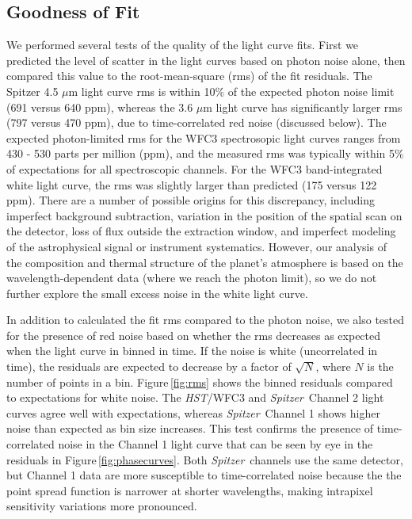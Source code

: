 \documentclass[twocolumn]{aastex61}
\newcommand{\project}[1]{\textsl{#1}}
\newcommand{\HST}{\project{HST}}
\newcommand{\Spitzer}{\project{Spitzer}}
\begin{document}
\subsection{Goodness of Fit}
\label{sec:fitquality}
We performed several tests of the quality of the light curve fits.  First we predicted the level of scatter in the light curves based on photon noise alone, then compared this value to the root-mean-square (rms) of the fit residuals.  The Spitzer 4.5 $\mu$m light curve rms is within 10\% of the expected photon noise limit (691 versus 640 ppm), whereas the 3.6 $\mu$m light curve has significantly larger rms (797 versus 470 ppm), due to time-correlated red noise (discussed below). The expected photon-limited rms for the WFC3 spectrosopic light curves ranges from 430 - 530 parts per million (ppm), and the measured rms was typically within 5\% of expectations for all spectroscopic channels.  For the WFC3 band-integrated white light curve, the rms was slightly larger than predicted (175 versus 122 ppm). There are a number of possible origins for this discrepancy, including imperfect background subtraction, variation in the position of the spatial scan on the detector, loss of flux outside the extraction window, and imperfect modeling of the astrophysical signal or instrument systematics. However, our analysis of the composition and thermal structure of the planet's atmosphere is based on the wavelength-dependent data (where we reach the photon limit), so we do not further explore the small excess noise in the white light curve. 


In addition to calculated the fit rms compared to the photon noise, we also tested for the presence of red noise based on whether the rms decreases as expected when the light curve in binned in time.  If the noise is white (uncorrelated in time), the residuals are expected to decrease by a factor of $\sqrt{N}$, where $N$ is the number of points in a bin. Figure\,\ref{fig:rms} shows the binned residuals compared to expectations for white noise. The \HST/WFC3 and \Spitzer\ Channel 2 light curves agree well with expectations, whereas \Spitzer\ Channel 1 shows higher noise than expected as bin size increases. This test confirms the presence of time-correlated noise in the Channel 1 light curve that can be seen by eye in the residuals in Figure\,\ref{fig:phasecurves}. Both \Spitzer\ channels use the same detector, but Channel 1 data are more susceptible to time-correlated noise because the the point spread function is narrower at shorter wavelengths, making intrapixel sensitivity variations more pronounced.
\end{document}
